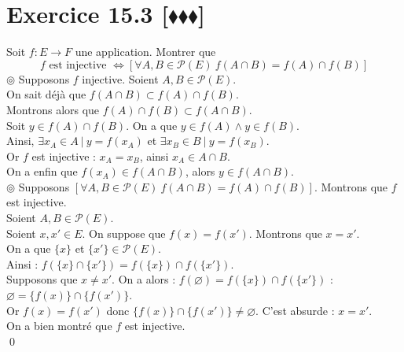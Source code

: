 \documentclass[10pt]{article}
\begin{document}
\section*{Exercice 15.3 [$\blacklozenge\blacklozenge\blacklozenge$]}
\begin{tcolorbox}[enhanced, width=7.6in, center, size=fbox, fontupper=\large, drop shadow southwest]
    Soit $f:E\to F$ une application. Montrer que
    \begin{equation*}
        f \text{ est injective } \iff [\forall A,B \in \mathcal{P}(E) ~ f(A \cap B) = f(A) \cap f(B)]
    \end{equation*}
    $\circledcirc$ Supposons $f$ injective. Soient $A,B \in \mathcal{P}(E)$.\\
    On sait déjà que $f(A \cap B) \subset f(A) \cap f(B)$.\\
    Montrons alors que $f(A) \cap f(B) \subset f(A \cap B)$.\\
    Soit $y \in f(A) \cap f(B)$. On a que $y \in f(A) \wedge y \in f(B)$.\\
    Ainsi, $\exists x_A \in A ~ | ~ y = f(x_A)$ et $\exists x_B \in B ~ | ~ y = f(x_B)$.\\
    Or $f$ est injective : $x_A = x_B$, ainsi $x_A \in A \cap B$.\\
    On a enfin que $f(x_A) \in f(A \cap B)$, alors $y \in f(A \cap B)$.\\[0.2cm]
    $\circledcirc$ Supposons $[\forall A,B \in \mathcal{P}(E) ~ f(A \cap B) = f(A) \cap f(B)]$. Montrons que $f$ est injective.\\
    Soient $A,B \in \mathcal{P}(E)$.\\
    Soient $x,x' \in E$. On suppose que $f(x) = f(x')$. Montrons que $x = x'$.\\
    On a que $\{x\}$ et $\{x'\} \in \mathcal{P}(E)$.\\
    Ainsi : $f(\{x\} \cap \{x'\}) = f(\{x\}) \cap f(\{x'\})$.\\
    Supposons que $x \neq x'$. On a alors : $f(\varnothing) = f(\{x\}) \cap f(\{x'\})$ : $\varnothing = \{f(x)\} \cap \{f(x')\}$.\\
    Or $f(x) = f(x')$ donc $\{f(x)\} \cap \{f(x')\} \neq \varnothing$. C'est absurde : $x = x'$.\\
    On a bien montré que $f$ est injective.\\
    \qed 
\end{tcolorbox}
\end{document}
